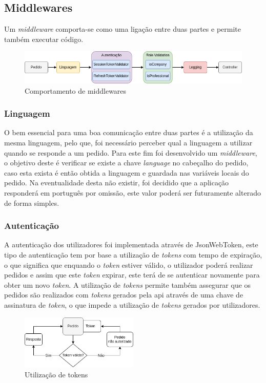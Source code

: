 \subsection{Middlewares} 
Um \textit{middleware} comporta-se como uma ligação entre duas partes e permite também executar código.

\begin{figure}[htb]
  \centering
  \includegraphics[width=\textwidth]{images/implementacao/api/middlewares.png}
  \caption{Comportamento de middlewares}
  \label{middlewares_png}
\end{figure}

\subsubsection{Linguagem}
O bem essencial para uma boa comunicação entre duas partes é a utilização da mesma linguagem, pelo que, foi necessário perceber qual a linguagem a utilizar quando se responde a um pedido. Para este fim foi desenvolvido um \textit{middleware}, o objetivo deste é verificar se existe a chave \textit{language} no cabeçalho do pedido, caso esta exista é então obtida a linguagem e guardada nas variáveis locais do pedido. Na eventualidade desta não existir, foi decidido que a aplicação responderá em português por omissão, este valor poderá ser futuramente alterado de forma simples.

\newpage

\subsubsection{Autenticação}
A autenticação dos utilizadores foi implementada através de JsonWebToken, este tipo de autenticação tem por base a utilização de \textit{tokens} com tempo de expiração, o que significa que enquando o \textit{token} estiver válido, o utilizador poderá realizar pedidos e assim que este \textit{token} expirar, este terá de se autenticar novamente para obter um novo \textit{token}.
A utilização de \textit{tokens} permite também assegurar que os pedidos são realizados com \textit{tokens} gerados pela api através de uma chave de assinatura de \textit{token}, o que impede a utilização de \textit{tokens} gerados por utilizadores.
\begin{figure}[htb]
  \centering
  \includegraphics[width=0.5\textwidth]{images/implementacao/api/jwt_session.png}
  \caption{Utilização de tokens}
  \label{fig:64}
\end{figure}

